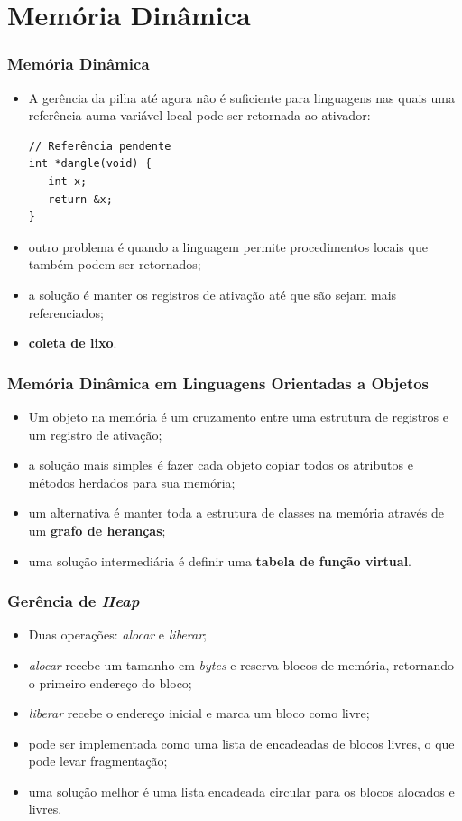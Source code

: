 \documentclass[table]{beamer}
\begin{document}
\section{Memória Dinâmica}
\begin{frame}[fragile]
   \frametitle{Memória Dinâmica}
   \begin{itemize}
      \item A gerência da pilha até agora não é suficiente para linguagens nas quais uma referência auma variável local pode ser retornada ao ativador:
      \begin{verbatim}
// Referência pendente
int *dangle(void) {
   int x;
   return &x;
}
      \end{verbatim}
      \item outro problema é quando a linguagem permite procedimentos locais que também podem ser retornados;
      \item a solução é manter os registros de ativação até que são sejam mais referenciados;
      \item \textbf{coleta de lixo}.
\end{itemize}
\end{frame}

\begin{frame}
   \frametitle{Memória Dinâmica em Linguagens Orientadas a Objetos}
   \begin{itemize}
      \item Um objeto na memória é um cruzamento entre uma estrutura de registros e um registro de ativação;
      \item a solução mais simples é fazer cada objeto copiar todos os atributos e métodos herdados para sua memória;
      \item um alternativa é manter toda a estrutura de classes na memória através de um \textbf{grafo de heranças};
      \item uma solução intermediária é definir uma \textbf{tabela de função virtual}.
   \end{itemize}
\end{frame}

\begin{frame}
   \frametitle{Gerência de \textit{Heap}}
   \begin{itemize}
      \item Duas operações: \textit{alocar} e \textit{liberar};
      \item \textit{alocar} recebe um tamanho em \textit{bytes} e reserva blocos de memória, retornando o primeiro endereço do bloco;
      \item \textit{liberar} recebe o endereço inicial e marca um bloco como livre;
      \item pode ser implementada como uma lista de encadeadas de blocos livres, o que pode levar fragmentação;
      \item uma solução melhor é uma lista encadeada circular para os blocos alocados e livres.
   \end{itemize}
\end{frame}
\end{document}
